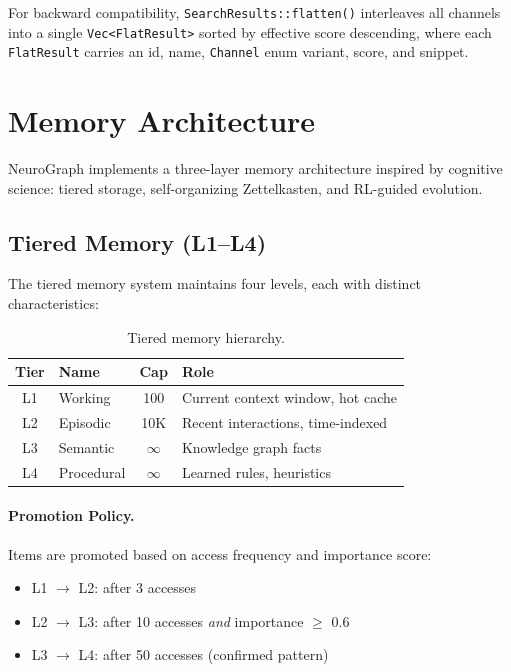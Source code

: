 \documentclass[11pt,a4paper,twocolumn]{article}
\begin{document}
For backward compatibility, \texttt{SearchResults::flatten()}
interleaves all channels into a single \texttt{Vec<FlatResult>}
sorted by effective score descending, where each \texttt{FlatResult}
carries an id, name, \texttt{Channel} enum variant, score, and
snippet.

\section{Memory Architecture}
\label{sec:memory}

NeuroGraph implements a three-layer memory architecture inspired by
cognitive science: tiered storage, self-organizing Zettelkasten, and
RL-guided evolution.

\subsection{Tiered Memory (L1--L4)}

The tiered memory system maintains four levels, each with distinct
characteristics:

\begin{table}[H]
\centering
\caption{Tiered memory hierarchy.}
\label{tab:tiers}
\begin{tabularx}{\columnwidth}{clcX}
\toprule
\textbf{Tier} & \textbf{Name} & \textbf{Cap} & \textbf{Role} \\
\midrule
L1 & Working & 100 & Current context window, hot cache \\
L2 & Episodic & 10K & Recent interactions, time-indexed \\
L3 & Semantic & $\infty$ & Knowledge graph facts \\
L4 & Procedural & $\infty$ & Learned rules, heuristics \\
\bottomrule
\end{tabularx}
\end{table}

\paragraph{Promotion Policy.} Items are promoted based on access
frequency and importance score:
\begin{itemize}[leftmargin=*]
  \item L1 $\to$ L2: after 3 accesses
  \item L2 $\to$ L3: after 10 accesses \emph{and} importance $\geq$ 0.6
  \item L3 $\to$ L4: after 50 accesses (confirmed pattern)
\end{itemize}
\end{document}
